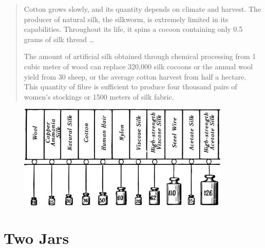 \begin{quote}
Cotton grows slowly, and its quantity depends on climate and harvest. The producer of natural silk, the silkworm, is extremely limited in its capabilities. Throughout its life, it spins a cocoon containing only 0.5 grams of silk thread \dots{}

The amount of artificial silk obtained through chemical processing from 1 cubic meter of wood can replace 320,000 silk cocoons or the annual wool yield from 30 sheep, or the average cotton harvest from half a hectare. This quantity of fibre is sufficient to produce four thousand pairs of women's stockings or 1500 meters of silk fabric.
\end{quote}
\begin{figure}[h!]
\centering
\includegraphics[width=0.9\textwidth]{figures/ch-11/fig-164a.pdf}
\end{figure}

\clearpage



\section{Two Jars}
\label{sec-11.4}




